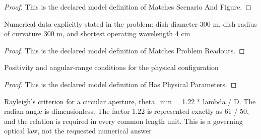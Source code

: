 \begin{proof}
  This is the declared model definition of Matches Scenario And Figure.
\end{proof}
\begin{definition}
  \label{def:physics:phyx-mini-0132:phyxminiproblems-problemphyxmini0132-matchesproblemreadouts}
  Numerical data explicitly stated in the problem: dish diameter 300 m, dish radius of curvature 300 m, and shortest operating wavelength 4 cm
\end{definition}
\begin{proof}
  This is the declared model definition of Matches Problem Readouts.
\end{proof}
\begin{definition}
  \label{def:physics:phyx-mini-0132:phyxminiproblems-problemphyxmini0132-hasphysicalparameters}
  Positivity and angular-range conditions for the physical configuration
\end{definition}
\begin{proof}
  This is the declared model definition of Has Physical Parameters.
\end{proof}
\begin{definition}
  \label{def:physics:phyx-mini-0132:phyxminiproblems-problemphyxmini0132-satisfiescircularaperturerayleighcriterion}
  Rayleigh's criterion for a circular aperture, theta\_min = 1.22 * lambda / D. The radian angle is dimensionless. The factor 1.22 is represented exactly as 61 / 50, and the relation is required in every common length unit. This is a governing optical law, not the requested numerical answer
\end{definition}
